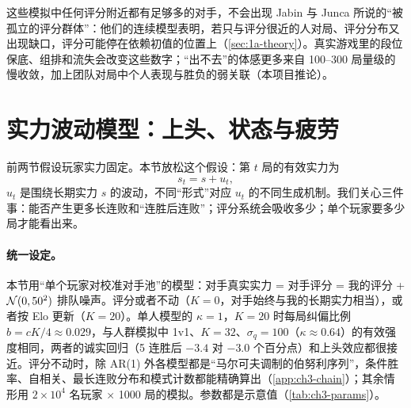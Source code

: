这些模拟中任何评分附近都有足够多的对手，不会出现 Jabin 与 Junca 所说的“被孤立的评分群体”：他们的连续模型表明，若只与评分很近的人对局、评分分布又出现缺口，评分可能停在依赖初值的位置上\cite{jabin2015continuous}\tagLit（\cref{sec:1a-theory}）。真实游戏里的段位保底、组排和流失会改变这些数字；“出不去”的体感更多来自 100–300 局量级的慢收敛，加上团队对局中个人表现与胜负的弱关联（本项目推论）。

\section{实力波动模型：上头、状态与疲劳}
\label{sec:ch3-fluct}

前两节假设玩家实力固定。本节放松这个假设：第 $t$ 局的有效实力为
\begin{equation}
s_t=s+u_t ,
\label{eq:ch3-fluct}
\end{equation}
$u_t$ 是围绕长期实力 $s$ 的波动，不同“形式”对应 $u_t$ 的不同生成机制。我们关心三件事：能否产生更多长连败和“连胜后连败”；评分系统会吸收多少；单个玩家要多少局才能看出来。

\paragraph{统一设定。} 本节用“单个玩家对校准对手池”的模型：对手真实实力 = 对手评分 = 我的评分 + $\mathcal{N}(0,50^2)$ 排队噪声。评分或者不动（$K=0$，对手始终与我的长期实力相当），或者按 Elo 更新（$K=20$）。单人模型的 $\kappa=1$，$K=20$ 时每局纠偏比例 $b=cK/4\approx0.029$，与人群模拟中 1v1、$K=32$、$\sigma_q=100$（$\kappa\approx0.64$）的有效强度相同，两者的诚实回归（5 连胜后 $-3.4$ 对 $-3.0$ 个百分点）和上头效应都很接近。评分不动时，除 AR(1) 外各模型都是“马尔可夫调制的伯努利序列”，条件胜率、自相关、最长连败分布和模式计数都能精确算出（\cref{app:ch3-chain}）；其余情形用 $2\times10^4$ 名玩家 $\times$ 1000 局的模拟。参数都是示意值（\cref{tab:ch3-params}）。

